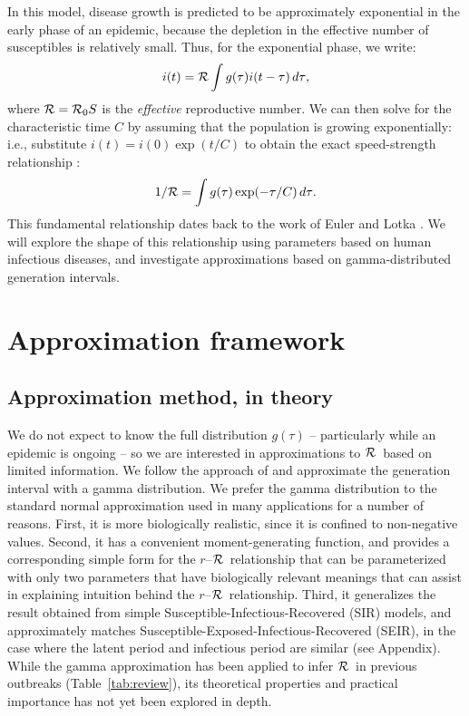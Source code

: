 \documentclass[12pt]{article}
\newcommand{\rR}{\mbox{$r$--$\cal R$}}
\newcommand{\RR}{\ensuremath{{\cal R}}}
\newcommand{\Rx}[1]{\ensuremath{{\cal R}_{#1}}}
\newcommand{\Ro}{\Rx{0}}
\newcommand{\Tc}{\ensuremath{C}}
\newcommand{\tref}[1]{Table~\ref{tab:#1}}
\begin{document}
In this model, disease growth is predicted to be approximately exponential in the early phase of an epidemic, because the depletion in the effective number of susceptibles is relatively small.
Thus, for the exponential phase, we write:
\begin{equation}
i(t) = \RR\int{g(\tau)i(t-\tau) \,d\tau},
\end{equation}
where $\RR = \Ro S$ is the \emph{effective} reproductive number.
We can then solve for the characteristic time $\Tc$ by assuming that the population is growing exponentially: i.e., substitute $i(t) = i(0) \exp(t/\Tc)$ to obtain the exact speed-strength relationship \cite{diekmann2000mathematical}:
\begin{equation}
	1/\RR = \int{g(\tau)\exp(-\tau/\Tc) \,d\tau}.\label{eq:Euler}
\end{equation}
This fundamental relationship dates back to the work of Euler and Lotka \cite{Lotka}. We will explore the shape of this relationship using parameters based on human infectious diseases, and investigate approximations based on gamma-distributed generation intervals.

\section{Approximation framework}
\label{approxframe}

\subsection{Approximation method, in theory}
We do not expect to know the full distribution $g(\tau)$ -- particularly while an epidemic is ongoing -- so we are interested in approximations to \RR\ based on limited information.
We follow the approach of \cite{NishCast09} and approximate the generation interval with a gamma distribution.
We prefer the gamma distribution to the standard normal approximation used in many applications for a number of reasons.
First, it is more biologically realistic, since it is confined to non-negative values.
Second, it has a convenient moment-generating function, and provides a corresponding simple form for the \rR\ relationship that can be parameterized with only two parameters that have biologically relevant meanings that can assist in explaining intuition behind the \rR\ relationship.
Third, it generalizes the result obtained from simple Susceptible-Infectious-Recovered (SIR) models, and approximately matches Susceptible-Exposed-Infectious-Recovered (SEIR), in the case where the latent period and infectious period are similar (see Appendix).
While the gamma approximation has been applied to infer \RR\ in previous outbreaks (\tref{review}), 
its theoretical properties and practical importance has not yet been explored in depth.
\end{document}
